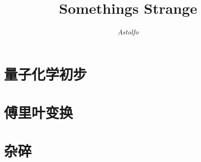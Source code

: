 \documentclass[lang=cn,10pt]{elegantbook}
\title{Somethings Strange}
\author{\textit{Astolfo}}
\begin{document}
\maketitle
\frontmatter


\mainmatter
\tableofcontents
\chapter{量子化学初步}

%
\chapter{傅里叶变换}

%
\chapter{杂碎}

\end{document}
